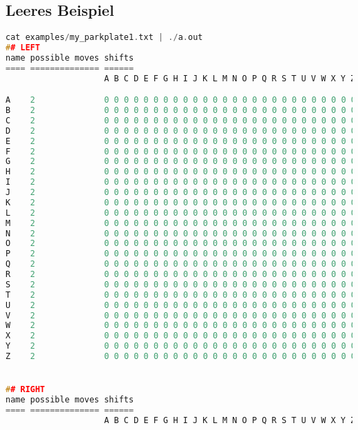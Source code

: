 \documentclass[a4paper,10pt,ngerman]{scrartcl}
\begin{document}
\subsection*{Leeres Beispiel}
\begin{lstlisting}[language=C++]
cat examples/my_parkplate1.txt | ./a.out
## LEFT
name possible moves shifts
==== ============== ======
                    A B C D E F G H I J K L M N O P Q R S T U V W X Y Z

A    2              0 0 0 0 0 0 0 0 0 0 0 0 0 0 0 0 0 0 0 0 0 0 0 0 0 0
B    2              0 0 0 0 0 0 0 0 0 0 0 0 0 0 0 0 0 0 0 0 0 0 0 0 0 0
C    2              0 0 0 0 0 0 0 0 0 0 0 0 0 0 0 0 0 0 0 0 0 0 0 0 0 0
D    2              0 0 0 0 0 0 0 0 0 0 0 0 0 0 0 0 0 0 0 0 0 0 0 0 0 0
E    2              0 0 0 0 0 0 0 0 0 0 0 0 0 0 0 0 0 0 0 0 0 0 0 0 0 0
F    2              0 0 0 0 0 0 0 0 0 0 0 0 0 0 0 0 0 0 0 0 0 0 0 0 0 0
G    2              0 0 0 0 0 0 0 0 0 0 0 0 0 0 0 0 0 0 0 0 0 0 0 0 0 0
H    2              0 0 0 0 0 0 0 0 0 0 0 0 0 0 0 0 0 0 0 0 0 0 0 0 0 0
I    2              0 0 0 0 0 0 0 0 0 0 0 0 0 0 0 0 0 0 0 0 0 0 0 0 0 0
J    2              0 0 0 0 0 0 0 0 0 0 0 0 0 0 0 0 0 0 0 0 0 0 0 0 0 0
K    2              0 0 0 0 0 0 0 0 0 0 0 0 0 0 0 0 0 0 0 0 0 0 0 0 0 0
L    2              0 0 0 0 0 0 0 0 0 0 0 0 0 0 0 0 0 0 0 0 0 0 0 0 0 0
M    2              0 0 0 0 0 0 0 0 0 0 0 0 0 0 0 0 0 0 0 0 0 0 0 0 0 0
N    2              0 0 0 0 0 0 0 0 0 0 0 0 0 0 0 0 0 0 0 0 0 0 0 0 0 0
O    2              0 0 0 0 0 0 0 0 0 0 0 0 0 0 0 0 0 0 0 0 0 0 0 0 0 0
P    2              0 0 0 0 0 0 0 0 0 0 0 0 0 0 0 0 0 0 0 0 0 0 0 0 0 0
Q    2              0 0 0 0 0 0 0 0 0 0 0 0 0 0 0 0 0 0 0 0 0 0 0 0 0 0
R    2              0 0 0 0 0 0 0 0 0 0 0 0 0 0 0 0 0 0 0 0 0 0 0 0 0 0
S    2              0 0 0 0 0 0 0 0 0 0 0 0 0 0 0 0 0 0 0 0 0 0 0 0 0 0
T    2              0 0 0 0 0 0 0 0 0 0 0 0 0 0 0 0 0 0 0 0 0 0 0 0 0 0
U    2              0 0 0 0 0 0 0 0 0 0 0 0 0 0 0 0 0 0 0 0 0 0 0 0 0 0
V    2              0 0 0 0 0 0 0 0 0 0 0 0 0 0 0 0 0 0 0 0 0 0 0 0 0 0
W    2              0 0 0 0 0 0 0 0 0 0 0 0 0 0 0 0 0 0 0 0 0 0 0 0 0 0
X    2              0 0 0 0 0 0 0 0 0 0 0 0 0 0 0 0 0 0 0 0 0 0 0 0 0 0
Y    2              0 0 0 0 0 0 0 0 0 0 0 0 0 0 0 0 0 0 0 0 0 0 0 0 0 0
Z    2              0 0 0 0 0 0 0 0 0 0 0 0 0 0 0 0 0 0 0 0 0 0 0 0 0 0


## RIGHT
name possible moves shifts
==== ============== ======
                    A B C D E F G H I J K L M N O P Q R S T U V W X Y Z


\end{lstlisting}
\end{document}
